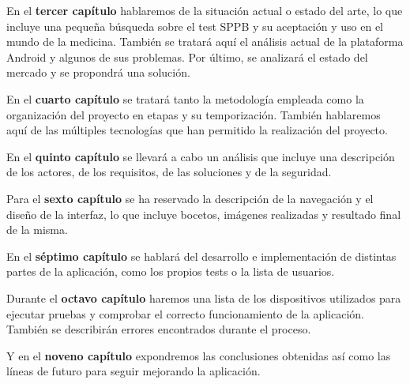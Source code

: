 En el \textbf{tercer capítulo} hablaremos de la situación actual o estado del arte, lo que incluye una pequeña búsqueda sobre el test SPPB y su aceptación y uso en el mundo de la medicina. También se tratará aquí el análisis actual de la plataforma Android y algunos de sus problemas. Por último, se analizará el estado del mercado y se propondrá una solución.

En el \textbf{cuarto capítulo} se tratará tanto la metodología empleada como la organización del proyecto en etapas y su temporización. También hablaremos aquí de las múltiples tecnologías que han permitido la realización del proyecto.

En el \textbf{quinto capítulo} se llevará a cabo un análisis que incluye una descripción de los actores, de los requisitos, de las soluciones y de la seguridad.

Para el \textbf{sexto capítulo} se ha reservado la descripción de la navegación y el diseño de la interfaz, lo que incluye bocetos, imágenes realizadas y resultado final de la misma.

En el \textbf{séptimo capítulo} se hablará del desarrollo e implementación de distintas partes de la aplicación, como los propios tests o la lista de usuarios.

Durante el \textbf{octavo capítulo} haremos una lista de los dispositivos utilizados para ejecutar pruebas y comprobar el correcto funcionamiento de la aplicación. También se describirán errores encontrados durante el proceso.

Y en el \textbf{noveno capítulo} expondremos las conclusiones obtenidas así como las líneas de futuro para seguir mejorando la aplicación.